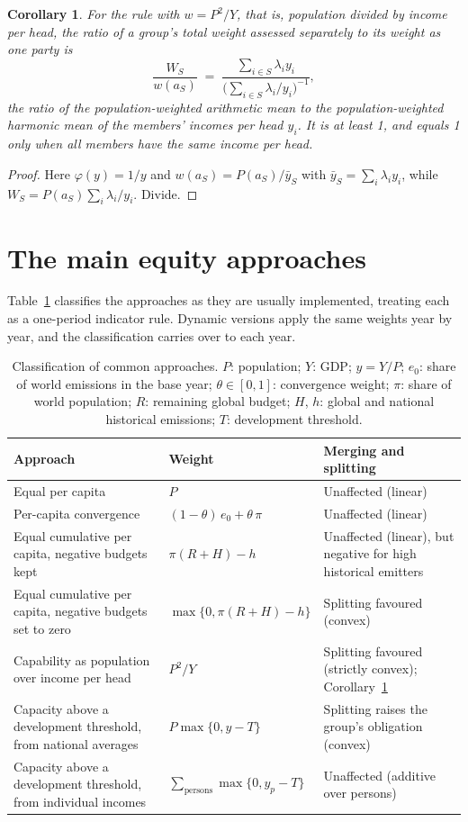 \documentclass[11pt]{article}
\newtheorem{corollary}{Corollary}
\theoremstyle{definition}
\theoremstyle{remark}
\begin{document}
\begin{corollary}\label{cor:amhm}
For the rule with $w=P^2/Y$, that is, population divided by income per head, the ratio of a group's total weight assessed separately to its weight as one party is
\[
\frac{W_S}{w(a_S)} \;=\; \frac{\sum_{i\in S}\lambda_i y_i}{\big(\sum_{i\in S}\lambda_i/y_i\big)^{-1}},
\]
the ratio of the population-weighted arithmetic mean to the population-weighted harmonic mean of the members' incomes per head $y_i$. It is at least 1, and equals 1 only when all members have the same income per head.
\end{corollary}

\begin{proof}
Here $\varphi(y)=1/y$ and $w(a_S)=P(a_S)/\bar y_S$ with $\bar y_S=\sum_i\lambda_i y_i$, while $W_S=P(a_S)\sum_i\lambda_i/y_i$. Divide.
\end{proof}

\section{The main equity approaches}\label{sec:approaches}

Table~\ref{tab:approaches} classifies the approaches as they are usually implemented, treating each as a one-period indicator rule. Dynamic versions apply the same weights year by year, and the classification carries over to each year.

\begin{table}[h]
\centering\small
\begin{tabular}{@{}p{5.2cm}p{3.6cm}p{4.6cm}@{}}
\toprule
Approach & Weight & Merging and splitting\\
\midrule
Equal per capita & $P$ & Unaffected (linear)\\
Per-capita convergence & $(1-\theta)\,e_0+\theta\,\pi$ & Unaffected (linear)\\
Equal cumulative per capita, negative budgets kept & $\pi(R+H)-h$ & Unaffected (linear), but negative for high historical emitters\\
Equal cumulative per capita, negative budgets set to zero & $\max\{0,\pi(R+H)-h\}$ & Splitting favoured (convex)\\
Capability as population over income per head \cite{rdp2023} & $P^2/Y$ & Splitting favoured (strictly convex); Corollary~\ref{cor:amhm}\\
Capacity above a development threshold, from national averages & $P\max\{0,y-T\}$ & Splitting raises the group's obligation (convex)\\
Capacity above a development threshold, from individual incomes & $\sum_{\text{persons}}\max\{0,y_p-T\}$ & Unaffected (additive over persons)\\
\bottomrule
\end{tabular}
\caption{Classification of common approaches. $P$: population; $Y$: GDP; $y=Y/P$; $e_0$: share of world emissions in the base year; $\theta\in[0,1]$: convergence weight; $\pi$: share of world population; $R$: remaining global budget; $H$, $h$: global and national historical emissions; $T$: development threshold.}
\label{tab:approaches}
\end{table}
\end{document}
